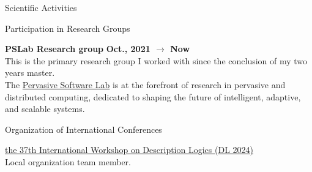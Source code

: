 \documentclass{resume} %
\begin{document}
    \begin{rSection}{Scientific Activities}


        \begin{rSubsection2}{Participation in Research Groups}
            \item\textbf{ PSLab Research group }\hfill \textbf{Oct., 2021 $\rightarrow$ Now}
            \\This is the primary research group I worked with since the conclusion of my two years master.
            \\The \href{https://pslab-unibo.github.io/}{Pervasive Software Lab} is at the forefront of research in pervasive and distributed computing, dedicated to shaping the future of intelligent, adaptive, and scalable systems.
        \end{rSubsection2}


        \begin{rSubsection2}{Organization of International Conferences}
            \item \href{https://dl2024.w.uib.no/organization/}{the 37th International Workshop on Description Logics (DL 2024)}
            \\Local organization team member.
        \end{rSubsection2}



\end{rSection}
\end{document}

